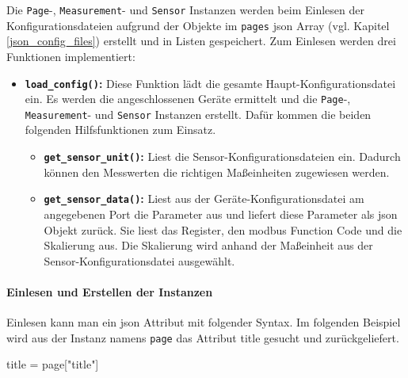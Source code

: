 Die \lstinline{Page}-, \lstinline{Measurement}- und \lstinline{Sensor} Instanzen werden beim Einlesen der Konfigurationsdateien aufgrund der Objekte im \lstinline{pages} \acs{json} Array (vgl. Kapitel \ref{json_config_files}) erstellt und in Listen gespeichert. \newline
Zum Einlesen werden drei Funktionen implementiert:
\begin{itemize}
	\item \textbf{\lstinline{load_config()}:} Diese Funktion lädt die gesamte Haupt-Konfigurationsdatei ein. Es werden die angeschlossenen Geräte ermittelt und die \lstinline{Page}-, \lstinline{Measurement}- und \lstinline{Sensor} Instanzen erstellt. Dafür kommen die beiden folgenden Hilfsfunktionen zum Einsatz.
    \begin{itemize}
		\item \textbf{\lstinline{get_sensor_unit()}:} Liest die Sensor-Konfigurationsdateien ein. Dadurch können den Messwerten die richtigen Maßeinheiten zugewiesen werden.
		\item \textbf{\lstinline{get_sensor_data()}:} Liest aus der Geräte-Konfigurationsdatei am angegebenen Port die Parameter aus und liefert diese Parameter als \acs{json} Objekt zurück. Sie liest das Register, den \gls{modbus} Function Code und die Skalierung aus. Die Skalierung wird anhand der Maßeinheit aus der Sensor-Konfigurationsdatei ausgewählt.
	\end{itemize}
\end{itemize}

\paragraph{Einlesen und Erstellen der Instanzen}
Einlesen kann man ein \acs{json} Attribut mit folgender Syntax. Im folgenden Beispiel wird aus der Instanz namens \lstinline{page} das Attribut title gesucht und zurückgeliefert.
\begin{pythoncode}
title = page["title"]
\end{pythoncode}

